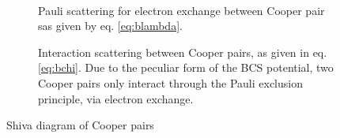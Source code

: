 \documentclass[aps,pra,amsmath,amssymb,preprint,groupedaddress]{revtex4}
\begin{document}
 \begin{figure}[htb]
 \centering
 
 \\
 \caption{Shiva diagram of Cooper pairs }


 \begin{description}
 
 
 \item[] Pauli scattering  for electron exchange between Cooper pair sas given by eq. \eqref{eq:blambda}.
 
 \item[] Interaction scattering   between Cooper pairs, as given in eq. \eqref{eq:bchi}. Due to the peculiar form of the BCS potential, two Cooper pairs only interact through the Pauli exclusion principle, via electron exchange. 
 \end{description} 


 \end{figure}
\appendix


\end{document}
